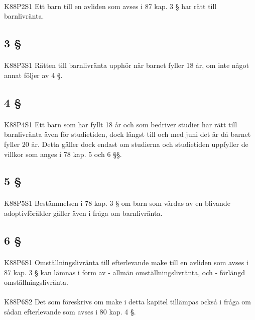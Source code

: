 \documentclass[a4paper,notitlepage,openany,10pt]{book}
\begin{document}
\paragraph*{}
{\tiny K88P2S1}
Ett barn till en avliden som avses i 87 kap. 3 § har rätt till barnlivränta.
\subsection*{3 §}
\paragraph*{}
{\tiny K88P3S1}
Rätten till barnlivränta upphör när barnet fyller 18 år, om inte något annat följer av 4 §.
\subsection*{4 §}
\paragraph*{}
{\tiny K88P4S1}
Ett barn som har fyllt 18 år och som bedriver studier har rätt till barnlivränta även för studietiden, dock längst till och med juni det år då barnet fyller 20 år. Detta gäller dock endast om studierna och studietiden uppfyller de villkor som anges i 78 kap. 5 och 6 §§.
\subsection*{5 §}
\paragraph*{}
{\tiny K88P5S1}
Bestämmelsen i 78 kap. 3 § om barn som vårdas av en blivande adoptivförälder gäller även i fråga om barnlivränta.
\subsection*{6 §}
\paragraph*{}
{\tiny K88P6S1}
Omställningslivränta till efterlevande make till en avliden som avses i 87 kap. 3 § kan lämnas i form av
\newline - allmän omställningslivränta, och
\newline - förlängd omställningslivränta.
\paragraph*{}
{\tiny K88P6S2}
Det som föreskrivs om make i detta kapitel tillämpas också i fråga om sådan efterlevande som avses i 80 kap. 4 §.
\end{document}
